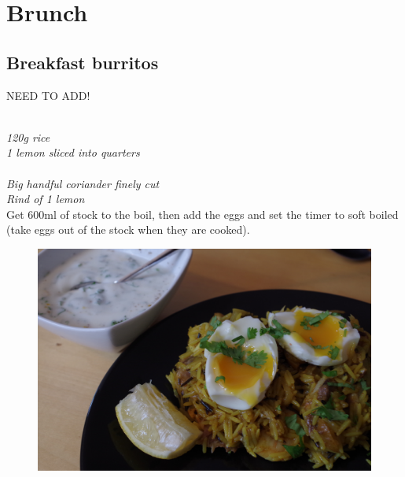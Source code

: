 \documentclass{tufte-book}
\begin{document}
\begin{figure}[p]
\hfill
{}
\end{figure}

\chapter{Brunch}

\section{Breakfast burritos}

NEED TO ADD!


\smallskip
{}
\\\emph{120g rice
\\1 lemon sliced into quarters
}
\\
\\\emph{Big handful coriander finely cut
\\Rind of 1 lemon
}
\smallskip
\\Get 600ml of stock to the boil, then add the eggs and set the timer to soft boiled (take eggs out of the stock when they are cooked).

\newpage

\begin{figure}[h]
  \includegraphics[width=\linewidth]{kedgeree2.JPG}
\end{figure}
\end{document}
